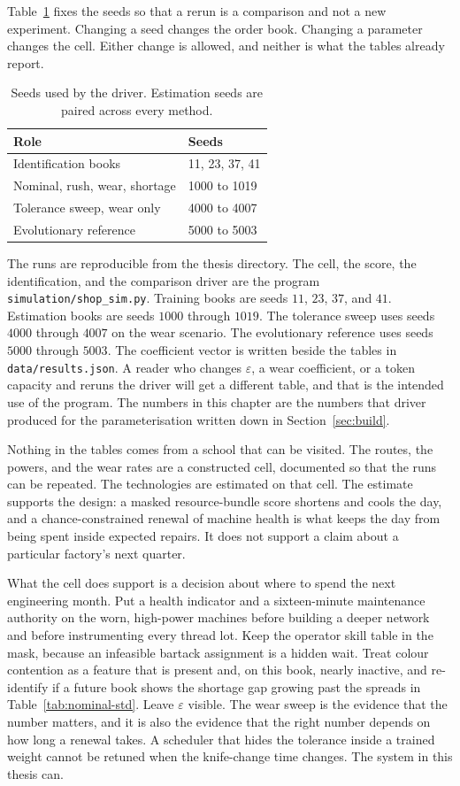 Table~\ref{tab:seeds} fixes the seeds so that a rerun is a comparison and not a new experiment. Changing a seed changes the order book. Changing a parameter changes the cell. Either change is allowed, and neither is what the tables already report.

\begin{table}[ht]
\centering
\caption{Seeds used by the driver. Estimation seeds are paired across every method.}
\label{tab:seeds}
\small
\begin{tabular}{ll}
\toprule
Role & Seeds \\
\midrule
Identification books & 11, 23, 37, 41 \\
Nominal, rush, wear, shortage & 1000 to 1019 \\
Tolerance sweep, wear only & 4000 to 4007 \\
Evolutionary reference & 5000 to 5003 \\
\bottomrule
\end{tabular}
\end{table}

The runs are reproducible from the thesis directory. The cell, the score, the identification, and the comparison driver are the program \texttt{simulation/shop\_sim.py}. Training books are seeds \(11\), \(23\), \(37\), and \(41\). Estimation books are seeds \(1000\) through \(1019\). The tolerance sweep uses seeds \(4000\) through \(4007\) on the wear scenario. The evolutionary reference uses seeds \(5000\) through \(5003\). The coefficient vector is written beside the tables in \texttt{data/results.json}. A reader who changes \(\varepsilon\), a wear coefficient, or a token capacity and reruns the driver will get a different table, and that is the intended use of the program. The numbers in this chapter are the numbers that driver produced for the parameterisation written down in Section~\ref{sec:build}.

Nothing in the tables comes from a school that can be visited. The routes, the powers, and the wear rates are a constructed cell, documented so that the runs can be repeated. The technologies are estimated on that cell. The estimate supports the design: a masked resource-bundle score shortens and cools the day, and a chance-constrained renewal of machine health is what keeps the day from being spent inside expected repairs. It does not support a claim about a particular factory's next quarter.

What the cell does support is a decision about where to spend the next engineering month. Put a health indicator and a sixteen-minute maintenance authority on the worn, high-power machines before building a deeper network and before instrumenting every thread lot. Keep the operator skill table in the mask, because an infeasible bartack assignment is a hidden wait. Treat colour contention as a feature that is present and, on this book, nearly inactive, and re-identify if a future book shows the shortage gap growing past the spreads in Table~\ref{tab:nominal-std}. Leave \(\varepsilon\) visible. The wear sweep is the evidence that the number matters, and it is also the evidence that the right number depends on how long a renewal takes. A scheduler that hides the tolerance inside a trained weight cannot be retuned when the knife-change time changes. The system in this thesis can.
